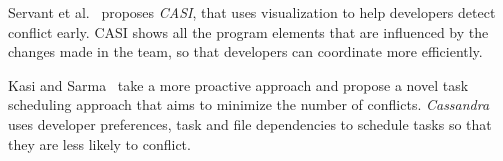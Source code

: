 Servant et al.~\cite{servant_casi:_2010} proposes \emph{CASI}, that uses visualization to help developers detect conflict early.
CASI shows all the program elements that are influenced by the changes made in the team, so that developers can coordinate more efficiently.

Kasi and Sarma~\cite{kasi_cassandra:_2013} take a more proactive approach and propose a novel task scheduling approach that aims to minimize the number of conflicts. 
\emph{Cassandra} uses developer preferences, task and file dependencies to schedule tasks so that they are less likely to conflict.
